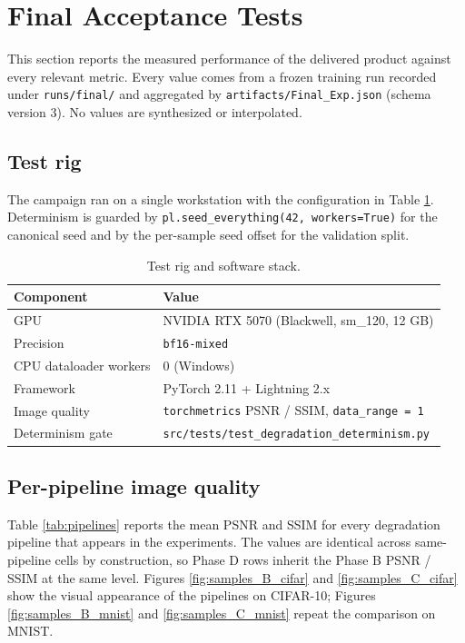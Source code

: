 \section{Final Acceptance Tests}
\label{sec:tests}

This section reports the measured performance of the delivered product
against every relevant metric. Every value comes from a frozen training run
recorded under \texttt{runs/final/} and aggregated by
\texttt{artifacts/Final\_Exp.json} (schema version 3). No values are
synthesized or interpolated.

\subsection{Test rig}
The campaign ran on a single workstation with the configuration in
Table \ref{tab:rig}. Determinism is guarded by
\texttt{pl.seed\_everything(42, workers=True)} for the canonical seed and by
the per-sample seed offset for the validation split.

\begin{table}[htbp]
\centering
\caption{Test rig and software stack.}
\label{tab:rig}
\setlength{\tabcolsep}{4pt}
\renewcommand{\arraystretch}{1.1}
\begin{tabular}{ll}
\toprule
Component & Value \\
\midrule
GPU                & NVIDIA RTX 5070 (Blackwell, sm\_120, 12 GB) \\
Precision          & \texttt{bf16-mixed} \\
CPU dataloader workers & 0 (Windows) \\
Framework          & PyTorch 2.11 \cite{paszke2019pytorch} + Lightning 2.x \cite{falcon2019lightning} \\
Image quality      & \texttt{torchmetrics} PSNR / SSIM, \texttt{data\_range = 1} \\
Determinism gate   & \texttt{src/tests/test\_degradation\_determinism.py} \\
\bottomrule
\end{tabular}
\end{table}

\subsection{Per-pipeline image quality}
\label{sec:tests:iq}

Table \ref{tab:pipelines} reports the mean PSNR and SSIM for every
degradation pipeline that appears in the experiments. The values are
identical across same-pipeline cells by construction, so Phase D rows
inherit the Phase B PSNR / SSIM at the same level. Figures
\ref{fig:samples_B_cifar} and \ref{fig:samples_C_cifar} show the visual
appearance of the pipelines on CIFAR-10; Figures \ref{fig:samples_B_mnist}
and \ref{fig:samples_C_mnist} repeat the comparison on MNIST.

